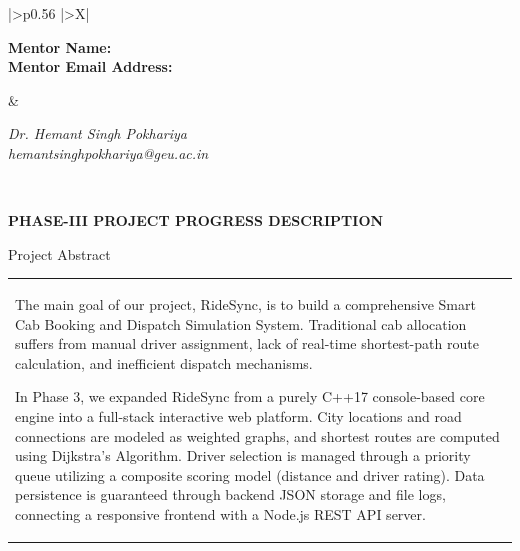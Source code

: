 \documentclass[12pt,a4paper]{article}
\newcommand{\sectiontitle}[1]{%
    {\color{GEUBlue}
    \fontsize{18}{22}\selectfont #1}
}
\newcommand{\answerbox}[2]{%
    \begin{tabularx}{\textwidth}{
        |>{\RaggedRight\arraybackslash}X|}
        \hline
        \parbox[t][#1][t]{\dimexpr\linewidth-12pt\relax}{
            \vspace{5pt}
            \fontsize{11}{13}\selectfont #2
        }\\
        \hline
    \end{tabularx}
}
\begin{document}
\noindent
\begin{tabularx}{\textwidth}{
|>{\RaggedRight\arraybackslash}p{0.56\textwidth}
|>{\RaggedRight\arraybackslash}X|
}
\hline

\begin{minipage}[t]{\linewidth}
\vspace{2mm}
\textbf{Mentor Name:}\\[-1mm]
\textbf{Mentor Email Address:}
\vspace{2mm}
\end{minipage}
&
\begin{minipage}[t]{\linewidth}
\vspace{2mm}
\textit{Dr. Hemant Singh Pokhariya}\\
\textit{hemantsinghpokhariya@geu.ac.in}
\vspace{2mm}
\end{minipage}
\\
\hline

\end{tabularx}

\newpage


\vspace*{0.15cm}

\noindent
\colorbox{GEUBannerBlue}{%
\parbox{\dimexpr\textwidth-2\fboxsep\relax}{
    \vspace{0.18cm}
    {\color{GEUYellow}
    \fontsize{17}{21}\selectfont
    \bfseries
    PHASE-III PROJECT PROGRESS DESCRIPTION}
    \vspace{0.18cm}
}}

\vspace{0.70cm}

\sectiontitle{Project Abstract}

\vspace{0.05cm}

\vspace{0.12cm}

\answerbox{4.60cm}{
The main goal of our project, RideSync, is to build a comprehensive Smart Cab Booking and Dispatch Simulation System. Traditional cab allocation suffers from manual driver assignment, lack of real-time shortest-path route calculation, and inefficient dispatch mechanisms.

In Phase 3, we expanded RideSync from a purely C++17 console-based core engine into a full-stack interactive web platform. City locations and road connections are modeled as weighted graphs, and shortest routes are computed using Dijkstra's Algorithm. Driver selection is managed through a priority queue utilizing a composite scoring model (distance and driver rating). Data persistence is guaranteed through backend JSON storage and file logs, connecting a responsive frontend with a Node.js REST API server.
}
\end{document}
